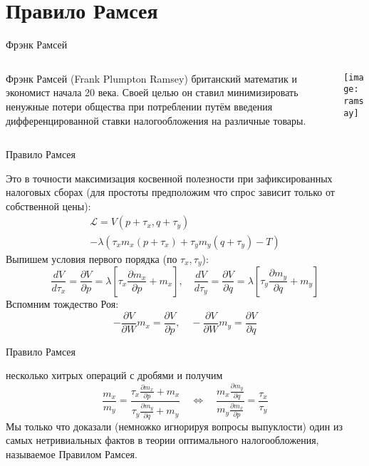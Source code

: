 \documentclass{beamer}
\begin{document}
\section{Правило Рамсея}

\begin{frame}{Фрэнк Рамсей}
\begin{columns}
\begin{column}{0.5\textwidth}
   \alert{Фрэнк Рамсей} (Frank Plumpton Ramsey) британский математик и экономист начала 20 века. Своей целью он ставил \alert{минимизировать ненужные потери общества} при потреблении путём введения \alert{дифференцированной ставки налогообложения} на различные товары. 
\end{column}
\begin{column}{0.5\textwidth}  %
    \begin{center}
     \texttt{[image: ramsay]}
     \end{center}
\end{column}
\end{columns}
\end{frame}

\begin{frame}{Правило Рамсея}

Это в точности максимизация косвенной полезности при зафиксированных налоговых сборах (для простоты предположим что спрос зависит только от собственной цены):
\begin{gather*}
\mathcal{L} = V(p+\tau_x,q+\tau_y) \\ - \lambda (\tau_x m_x(p+ \tau_x) + \tau_y m_y(q+\tau_y) - T)
\end{gather*}
Выпишем условия первого порядка (по $\tau_x, \tau_y$):
$$\frac{d V}{d \tau_x} = \frac{\partial V}{\partial p} = \lambda [\tau_x \frac{\partial m_x}{\partial p} + m_x], \quad \frac{d V}{d \tau_y} = \frac{\partial V}{\partial q} = \lambda [\tau_y \frac{\partial m_y}{\partial q}+m_y]$$
Вспомним тождество Роя:
$$-\frac{\partial V}{\partial W}m_x = \frac{\partial V}{\partial p}, \quad -\frac{\partial V}{\partial W}m_y = \frac{\partial V}{\partial q}$$
\end{frame}

\begin{frame}{Правило Рамсея}

несколько хитрых операций с дробями и получим
$$ \frac{m_x}{m_y} = \frac{\tau_x \frac{\partial m_x}{\partial p} + m_x}{\tau_y \frac{\partial m_y}{\partial q}+m_y} \quad \Leftrightarrow \quad \frac{m_x \frac{\partial m_y}{\partial q}}{m_y \frac{\partial m_x}{\partial p}} = \frac{\tau_x}{\tau_y}$$
Мы только что доказали (немножко игнорируя вопросы выпуклости) один из самых нетривиальных фактов в теории оптимального налогообложения, называемое Правилом Рамсея.
\end{frame}
\end{document}

